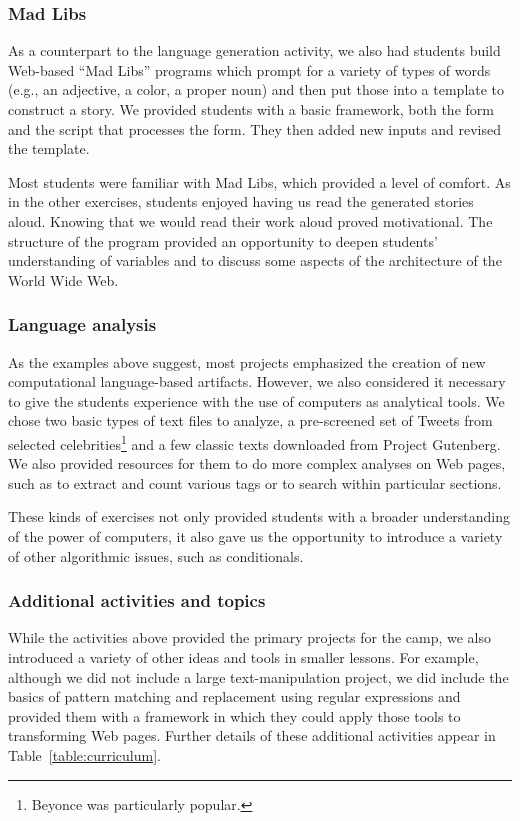 \subsubsection{Mad Libs}

As a counterpart to the language generation activity, we also had students
build Web-based ``Mad Libs'' programs which prompt for a variety of types
of words (e.g., an adjective, a color, a proper noun) and then put those
into a template to construct a story.  We provided students with a basic
framework, both the form and the script that processes the form.  They
then added new inputs and revised the template.

Most students were familiar with Mad Libs, which provided a level
of comfort. As in the other exercises, students enjoyed having us
read the generated stories aloud.  Knowing that we would read their
work aloud proved motivational.  The structure of the program
provided an opportunity to deepen students' understanding of variables
and to discuss some aspects of the architecture of the World Wide
Web.

\subsubsection{Language analysis}

As the examples above suggest, most projects emphasized the creation
of new computational language-based artifacts.  However, we also
considered it necessary to give the students experience with the
use of computers as analytical tools.  We chose two basic types of
text files to analyze, a pre-screened set of Tweets from selected
celebrities\footnote{Beyonce was particularly popular.} and a few
classic texts downloaded from Project Gutenberg.  We also provided
resources for them to do more complex analyses on Web pages, such
as to extract and count various tags or to search within particular
sections.

These kinds of exercises not only provided students with a broader 
understanding of the power of computers, it also gave us the opportunity
to introduce a variety of other algorithmic issues, such as conditionals.

\subsubsection{Additional activities and topics}

While the activities above provided the primary projects for the
camp, we also introduced a variety of other ideas and tools in
smaller lessons.  For example, although we did not include a large
text-manipulation project, we did include the basics of pattern
matching and replacement using regular expressions and provided
them with a framework in which they could apply those tools to
transforming Web pages.  Further details of these additional
activities appear in Table~\ref{table:curriculum}.

